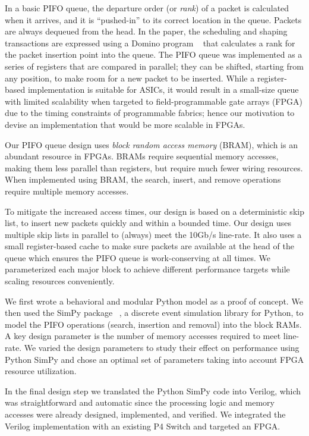In a basic PIFO queue, the departure order (or {\em rank}) of a packet is calculated when it arrives, and it is ``pushed-in'' to its  correct location in the queue. Packets are always dequeued from the head. In the paper, the scheduling and shaping transactions are expressed using a Domino program ~\cite{domino:2015} that calculates a rank for the packet insertion point into the queue.  The PIFO queue was implemented as a series of registers that are compared in parallel; they can be shifted, starting from any position, to make room for a new packet to be inserted.  While a register-based implementation is suitable for ASICs, it would result in a small-size queue with limited scalability when targeted to field-programmable gate arrays (FPGA) due to the timing constraints of programmable fabrics; hence our motivation to devise an implementation that would be more scalable in FPGAs.

Our PIFO queue design uses {\em block random access memory} (BRAM), which is an abundant resource in FPGAs.  BRAMs require sequential memory accesses, making them less parallel than registers, but require much fewer wiring resources.   When implemented using BRAM, the search, insert, and remove operations require multiple memory accesses. 

To mitigate the increased access times, our design is based on a deterministic skip list, to insert new packets quickly and within a bounded time. Our design uses multiple skip lists in parallel to (always) meet the 10Gb/s line-rate. It also uses a small register-based cache to make sure packets are available at the head of the queue which ensures the PIFO queue is work-conserving at all times. We parameterized each major block to achieve different performance targets while scaling resources conveniently.

We first wrote a behavioral and modular Python model as a proof of concept.  We then used the SimPy package ~\cite{SimPy}, a discrete event simulation library for Python, to model the PIFO operations (search, insertion and removal) into the block RAMs. A key design parameter is the number of memory accesses required to meet line-rate. We varied the design parameters to study their effect on performance using Python SimPy and chose an optimal set of parameters taking into account FPGA resource utilization.  

In the final design step we translated the Python SimPy code into Verilog, which was straightforward and automatic since the processing logic and memory accesses were already designed, implemented, and verified.  We integrated the Verilog implementation with an existing P4 Switch and targeted an FPGA. 

